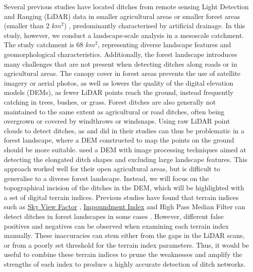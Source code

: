 \documentclass[11pt, review]{elsarticle} %
\begin{document}
Several previous studies have located ditches from remote sensing Light Detection and Ranging (LiDAR) data in smaller agricultural areas \citep{roelens, bailly} or smaller forest areas (smaller than 2 $km^2$) \citep{rapinel, kiss}, predominantly characterised by artificial drainage. In this study, however, we conduct a landscape-scale analysis in a mesoscale catchment. The study  catchment  is 68 $km^2$, representing diverse landscape features and geomorphological characteristics. Additionally, the forest landscape introduces many challenges that are not present when detecting ditches along roads or in agricultural areas. The canopy cover in forest areas prevents the use of satellite imagery or aerial photos, as well as lowers the quality of the digital elevation models (DEMs), as fewer LiDAR points reach the ground, instead frequently catching in trees, bushes, or grass. Forest ditches are also generally not maintained to the same extent as agricultural or road ditches, often being overgrown or covered by windthrows or windsnaps. Using raw LiDAR point clouds to detect ditches, as \citet{roelens} and \citet{bailly} did in their studies can thus be problematic in a forest landscape, where a DEM constructed to map the points on the ground should be more suitable. \citet{cazorzi} used a DEM with image processing techniques aimed at detecting the elongated ditch shapes and excluding large landscape features. This approach worked well for their open agricultural areas, but is difficult to generalise to a diverse forest landscape. Instead, we will focus on the topographical incision of the ditches in the DEM, which will be highlighted with a set of digital terrain indices. Previous studies have found that terrain indices such as \hyperref[skyviewfactor]{Sky View Factor} \citep{zaksek}, \hyperref[impoundment]{Impoundment Index} \citep{whiteboxtools} and High Pass Median Filter \citep{whiteboxtools} can detect ditches in forest landscapes in some cases \citep{uppsala}. However, different false positives and negatives can be observed when examining each terrain index manually. These inaccuracies can stem either from the gaps in the LiDAR scans, or from a poorly set threshold for the terrain index parameters. Thus, it would be useful to combine these terrain indices to prune the weaknesses and amplify the strengths of each index to produce a highly accurate detection of ditch networks. 
\end{document}
